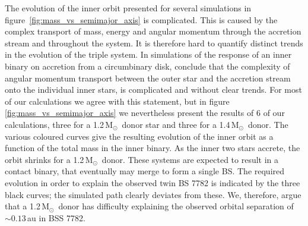 \documentclass{aastex62}
\newcommand{\MSun}{\mbox{M$_\odot$}}
\begin{document}
The evolution of the inner orbit presented for several simulations in
figure~\ref{fig:mass_vs_semimajor_axis} is complicated.  This is
caused by the complex transport of mass, energy and angular momentum
through the accretion stream and throughout the system.  It is
therefore hard to quantify distinct trends in the evolution of the
triple system. In simulations of the response of an inner binary on
accretion from a circumbinary disk, \cite{2018arXiv181208175M}
conclude that the complexity of angular momentum transport between
the outer star and the accretion stream onto the individual inner stars, is
complicated and without clear trends. For most of our calculations we
agree with this statement, but in
figure~\,\ref{fig:mass_vs_semimajor_axis} we nevertheless present the
results of 6 of our calculations, three for a 1.2\,\MSun\, donor star and
three for a 1.4\,\MSun\, donor. The various coloured curves give
the resulting evolution of the inner orbit as a function of the total
mass in the inner binary. As the inner two stars accrete, the orbit shrinks 
for a 1.2\,\MSun\, donor. These systems
are expected to result in a contact binary, that eventually may merge
to form a single BS. The required evolution in order to
explain the observed twin BS 7782 is indicated by the
three black curves; the simulated path clearly deviates from
these. We, therefore, argue that a 1.2\,\MSun\, donor has difficulty
explaining the observed orbital separation of $\sim 0.13$\,au in BSS
7782.
\end{document}
